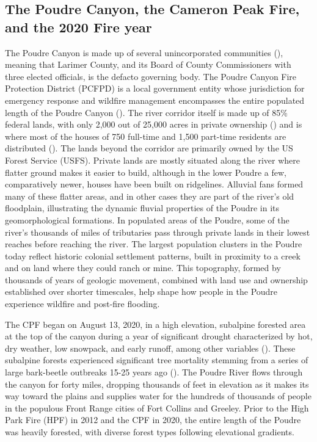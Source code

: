 \documentclass[
]{article}
\begin{document}
\subsection{The Poudre Canyon, the Cameron Peak Fire, and the 2020 Fire year}\label{the-poudre-canyon-the-cameron-peak-fire-and-the-2020-fire-year}

The Poudre Canyon is made up of several unincorporated communities (), meaning that Larimer County, and its Board of County Commissioners with three elected officials, is the defacto governing body. The Poudre Canyon Fire Protection District (PCFPD) is a local government entity whose jurisdiction for emergency response and wildfire management encompasses the entire populated length of the Poudre Canyon (). The river corridor itself is made up of 85\% federal lands, with only 2,000 out of 25,000 acres in private ownership () and is where most of the houses of 750 full-time and 1,500 part-time residents are distributed (). The lands beyond the corridor are primarily owned by the US Forest Service (USFS). Private lands are mostly situated along the river where flatter ground makes it easier to build, although in the lower Poudre a few, comparatively newer, houses have been built on ridgelines. Alluvial fans formed many of these flatter areas, and in other cases they are part of the river's old floodplain, illustrating the dynamic fluvial properties of the Poudre in its geomorphological formations. In populated areas of the Poudre, some of the river's thousands of miles of tributaries pass through private lands in their lowest reaches before reaching the river. The largest population clusters in the Poudre today reflect historic colonial settlement patterns, built in proximity to a creek and on land where they could ranch or mine. This topography, formed by thousands of years of geologic movement, combined with land use and ownership established over shorter timescales, help shape how people in the Poudre experience wildfire and post-fire flooding.

The CPF began on August 13, 2020, in a high elevation, subalpine forested area at the top of the canyon during a year of significant drought characterized by hot, dry weather, low snowpack, and early runoff, among other variables (). These subalpine forests experienced significant tree mortality stemming from a series of large bark-beetle outbreaks 15-25 years ago (). The Poudre River flows through the canyon for forty miles, dropping thousands of feet in elevation as it makes its way toward the plains and supplies water for the hundreds of thousands of people in the populous Front Range cities of Fort Collins and Greeley. Prior to the High Park Fire (HPF) in 2012 and the CPF in 2020, the entire length of the Poudre was heavily forested, with diverse forest types following elevational gradients.
\end{document}
